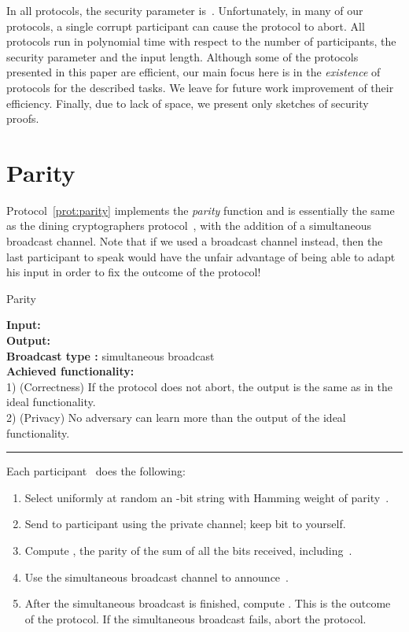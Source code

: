 \documentclass[11pt]{article}
\begin{document}
In all protocols, the security parameter is~. Unfortunately, in
many of our protocols, a single corrupt participant can cause the
protocol to abort. All protocols run in polynomial time with respect
to the number of participants, the security parameter and the input
length. Although some of the protocols presented in this paper are
efficient, our main focus here is in the \emph{existence} of
protocols for the described tasks. We leave for future work
improvement of their efficiency. Finally, due to lack of space, we
present only sketches of security proofs.


\section{Parity}
\label{sec:parity}



Protocol~\ref{prot:parity} implements the \emph{parity} function
and is essentially the same as the dining cryptographers
protocol~\cite{Chaum88}, with the addition of a simultaneous
broadcast channel. Note that if we used a broadcast channel instead,
then the last participant to speak would have the unfair advantage
of being able to adapt his input in order to fix the outcome of the
protocol!


\begin{protocol} \caption{Parity} \label{prot:parity}
{\bf Input:}  \\
{\bf Output:}  \\
{\bf Broadcast type :} simultaneous broadcast \\
{\bf Achieved functionality:} \\
1) (Correctness) If the protocol does not abort, the output is the same as in the ideal functionality.  \\
2) (Privacy) No adversary can learn more than the output of the
ideal functionality. \vspace{2pt}
 \hrule  \vspace{2pt}
Each participant~ does the
following:
\begin{enumerate}
\item \label{ParityStep1} Select uniformly at random an -bit  string  with Hamming weight of parity~.
\item Send  to participant  using the private channel;
keep bit  to yourself.
\item Compute , the parity of the sum of all the bits  received, including~.
\item Use the simultaneous broadcast channel to announce~.
\label{step:broadcast}
\item \label{step:compute}After the simultaneous broadcast is finished, compute . This is the outcome of the protocol.
If the simultaneous broadcast fails, abort the protocol.
\end{enumerate}
\end{protocol}
\end{document}
